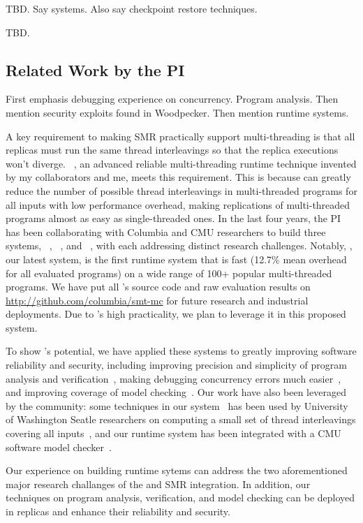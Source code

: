  TBD.
Say systems.
Also say checkpoint restore techniques.

 TBD.



\subsection{Related Work by the PI} \label{sec:my-work}

First emphasis debugging experience on concurrency. Program analysis.
Then mention security exploits found in Woodpecker.
Then mention runtime systems.

A key requirement to making SMR practically support multi-threading is that all 
replicas must run the same thread interleavings so that the replica executions 
won't diverge. \smt~\cite{smt:cacm}, an advanced reliable multi-threading 
runtime technique invented by my collaborators and me, meets this requirement. 
This is because \smt can greatly reduce the number of possible thread 
interleavings in multi-threaded programs for all inputs with low performance 
overhead, making replications of multi-threaded programs almost as easy as 
single-threaded ones. In the last four years, the PI has been collaborating 
with Columbia and CMU researchers to build three \smt systems, 
\tern~\cite{cui:tern:osdi10}, \peregrine~\cite{peregrine:sosp11}, and 
\parrot~\cite{parrot:sosp13}, with each addressing distinct research 
challenges. Notably, \parrot, our latest system, is the first \smt runtime 
system that is fast (12.7\% mean overhead for all evaluated programs) on a wide 
range of 100+ popular multi-threaded programs. We have 
put all \parrot's source code and raw evaluation results on 
\url{http://github.com/columbia/smt-mc} for future research and industrial 
deployments. Due to \parrot's high practicality, we plan to leverage it in this 
proposed \msmr system.

To show \smt's potential, we have applied these systems to greatly improving 
software reliability and security, including improving precision and simplicity 
of program analysis and verification~\cite{wu:pldi12}, making debugging 
concurrency errors much easier~\cite{cui:tern:osdi10}, and improving coverage 
of model checking~\cite{parrot:sosp13}. Our work have also been leveraged by 
the community: some techniques in our \tern system~\cite{cui:tern:osdi10} has 
been used by University of Washington Seatle researchers on computing a small 
set of thread interleavings covering all inputs~\cite{ics:oopsla13}, and our 
\parrot runtime system has been integrated with a CMU software model 
checker~\cite{dbug:spin11}.

Our experience on building \smt runtime sytems can address the two 
aforementioned major research challanges of the \smt and SMR integration. In 
addition, our techniques on program analysis, verification, and model checking 
can be deployed in \msmr replicas and enhance their reliability and security.


